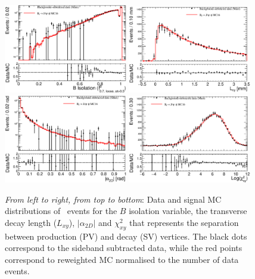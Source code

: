 \begin{figure}[!htb]
\begin{center}
\hspace*{-0.5cm}
\includegraphics[width=0.48\textwidth]{figures/InternalNote_DataMCComparison/Bs/bsjpsiphi_iso.eps}
\hspace*{-0.5cm}
\includegraphics[width=0.48\textwidth]{figures/InternalNote_DataMCComparison/Bs/bsjpsiphi_Lxy.eps}\\
\hspace*{-0.5cm}
\includegraphics[width=0.48\textwidth]{figures/InternalNote_DataMCComparison/Bs/bsjpsiphi_a2D.eps}
\hspace*{-0.5cm}
\includegraphics[width=0.48\textwidth]{figures/InternalNote_DataMCComparison/Bs/bsjpsiphi_chi2PVSV.eps}
\caption{{\it{From left to right, from top to bottom}}: 
Data and signal MC distributions of \BsJpsiPhi\ events for the $B$ isolation variable, 
the transverse decay length ($L_{xy}$), $|\alpha_{2D}|$ and 
$\chi^{2}_{xy}$ that represents the separation between production
(PV) and decay (SV) vertices.
The black dots correspond to the sideband subtracted data, while 
the red points correspond to reweighted MC normalised to the number
of data events.}
\label{fig:jpsiphivars}
\end{center}
\end{figure}
